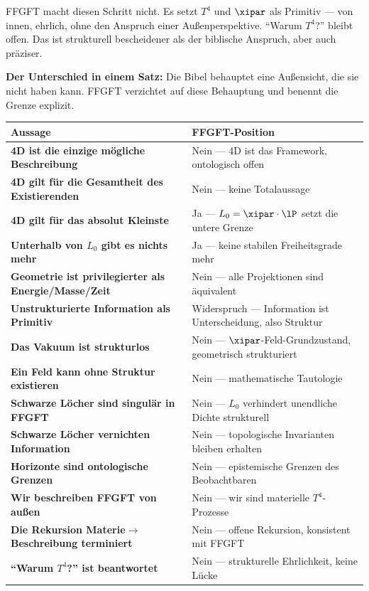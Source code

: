 FFGFT macht diesen Schritt nicht. Es setzt $T^4$ und $\xipar$ als Primitiv --- von innen, ehrlich, ohne den Anspruch einer Außenperspektive. ``Warum $T^4$?'' bleibt offen. Das ist strukturell bescheidener als der biblische Anspruch, aber auch präziser.

\begin{erkenntnis}
\textbf{Der Unterschied in einem Satz:} Die Bibel behauptet eine Außensicht, die sie nicht haben kann. FFGFT verzichtet auf diese Behauptung und benennt die Grenze explizit.
\end{erkenntnis}


\begin{longtable}{>{\bfseries}p{7.2cm} p{7.2cm}}
\toprule
Aussage & FFGFT-Position \\
\midrule
4D ist die einzige mögliche Beschreibung & Nein --- 4D ist das Framework, ontologisch offen \\
4D gilt für die Gesamtheit des Existierenden & Nein --- keine Totalaussage \\
4D gilt für das absolut Kleinste & Ja --- $L_0 = \xipar \cdot \lP$ setzt die untere Grenze \\
Unterhalb von $L_0$ gibt es nichts mehr & Ja --- keine stabilen Freiheitsgrade mehr \\
Geometrie ist privilegierter als Energie/Masse/Zeit & Nein --- alle Projektionen sind äquivalent \\
Unstrukturierte Information als Primitiv & Widerspruch --- Information ist Unterscheidung, also Struktur \\
Das Vakuum ist strukturlos & Nein --- $\xipar$-Feld-Grundzustand, geometrisch strukturiert \\
Ein Feld kann ohne Struktur existieren & Nein --- mathematische Tautologie \\
Schwarze Löcher sind singulär in FFGFT & Nein --- $L_0$ verhindert unendliche Dichte strukturell \\
Schwarze Löcher vernichten Information & Nein --- topologische Invarianten bleiben erhalten \\
Horizonte sind ontologische Grenzen & Nein --- epistemische Grenzen des Beobachtbaren \\
Wir beschreiben FFGFT von außen & Nein --- wir sind materielle $T^4$-Prozesse \\
Die Rekursion Materie$\to$Beschreibung terminiert & Nein --- offene Rekursion, konsistent mit FFGFT \\
``Warum $T^4$?'' ist beantwortet & Nein --- strukturelle Ehrlichkeit, keine Lücke \\
\bottomrule
\end{longtable}


